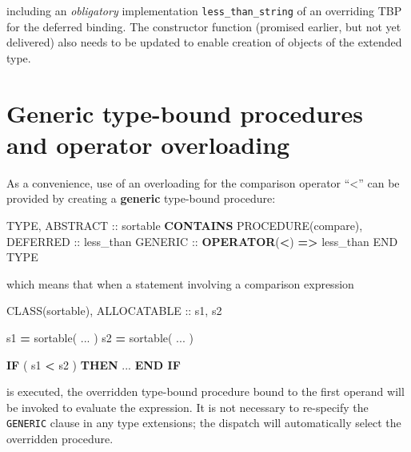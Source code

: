 \documentclass[
  paper=a4,
  ,captions=tableheading
]{scrartcl}
\newenvironment{Shaded}{\begin{snugshade}}{\end{snugshade}}
\newcommand{\DataTypeTok}[1]{\textcolor[rgb]{0.13,0.29,0.53}{#1}}
\newcommand{\KeywordTok}[1]{\textcolor[rgb]{0.13,0.29,0.53}{\textbf{#1}}}
\newcommand{\NormalTok}[1]{#1}
\newcommand{\OperatorTok}[1]{\textcolor[rgb]{0.81,0.36,0.00}{\textbf{#1}}}
\begin{document}
including an \emph{obligatory} implementation
\texttt{less\_than\_string} of an overriding TBP for the deferred
binding. The constructor function (promised earlier, but not yet
delivered) also needs to be updated to enable creation of objects of the
extended type.

\section{Generic type-bound procedures and operator
overloading}\label{generic-type-bound-procedures-and-operator-overloading}

As a convenience, use of an overloading for the comparison operator
``\textless{}'' can be provided by creating a \textbf{generic}
type-bound procedure:

\begin{Shaded}
\begin{Highlighting}[]
\DataTypeTok{TYPE}\NormalTok{, }\DataTypeTok{ABSTRACT} \DataTypeTok{::}\NormalTok{ sortable}
\KeywordTok{CONTAINS}
   \DataTypeTok{PROCEDURE(compare)}\NormalTok{, }\DataTypeTok{DEFERRED} \DataTypeTok{::}\NormalTok{ less\_than}
   \DataTypeTok{GENERIC} \DataTypeTok{::} \KeywordTok{OPERATOR}\NormalTok{(}\OperatorTok{\textless{}}\NormalTok{) }\KeywordTok{=}\OperatorTok{\textgreater{}}\NormalTok{ less\_than}
\DataTypeTok{END TYPE}
\end{Highlighting}
\end{Shaded}

which means that when a statement involving a comparison expression

\begin{Shaded}
\begin{Highlighting}[]
\DataTypeTok{CLASS(sortable)}\NormalTok{, }\DataTypeTok{ALLOCATABLE} \DataTypeTok{::}\NormalTok{ s1, s2}

\NormalTok{s1 }\KeywordTok{=}\NormalTok{ sortable( ... )}
\NormalTok{s2 }\KeywordTok{=}\NormalTok{ sortable( ... )}

\KeywordTok{IF}\NormalTok{ ( s1 }\OperatorTok{\textless{}}\NormalTok{ s2 ) }\KeywordTok{THEN}
\NormalTok{   ...}
\KeywordTok{END IF}
\end{Highlighting}
\end{Shaded}

is executed, the overridden type-bound procedure bound to the first
operand will be invoked to evaluate the expression. It is not necessary
to re-specify the \texttt{GENERIC} clause in any type extensions; the
dispatch will automatically select the overridden procedure.
\end{document}
